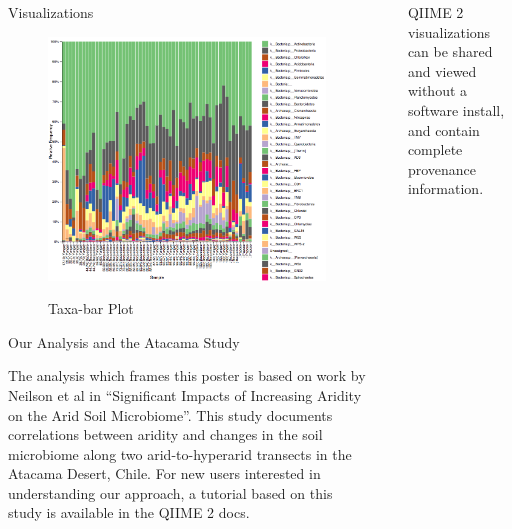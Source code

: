 \documentclass[final]{beamer}
\newlength{\sepwidth}
\newlength{\colwidth}
\newcommand{\separatorcolumn}{\begin{column}{\sepwidth}\end{column}}
\begin{document}
\begin{frame}[t]
\begin{columns}[t]
\begin{column}{\colwidth}
\begin{block}{Visualizations}
    \begin{figure}[tph!]
      {\includegraphics[width=\linewidth]{assets/taxabar-plot}}
      \caption{Taxa-bar Plot}
    \end{figure}



  \end{block}

  \begin{block}{Our Analysis and the Atacama Study}

    The analysis which frames this poster is based on work by Neilson et al in
    “Significant Impacts of Increasing Aridity on the Arid Soil Microbiome”\cite{Neilsone00195-16}.
    This study documents correlations between aridity and changes in the soil
    microbiome along two arid-to-hyperarid transects in the Atacama Desert,
    Chile. For new users interested in understanding our approach, a tutorial
    based on this study is available in the QIIME 2 docs. 

  \end{block}

\end{column}

\separatorcolumn

\begin{column}{\colwidth}

  \begin{block}{QIIME 2 visualizations can be shared and viewed without a software install, and contain complete provenance information.}


\end{block}
\end{column}
\end{columns}
\end{frame}
\end{document}
